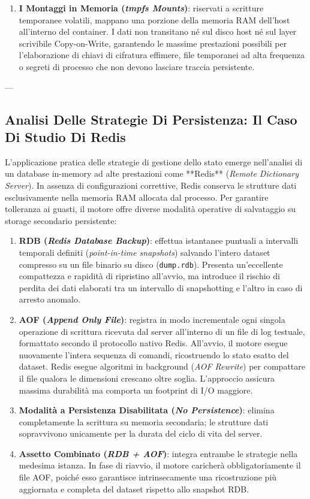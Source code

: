 \documentclass[11pt, a4paper]{article}
\begin{document}
\begin{enumerate}
\begin{itemize}
    \end{itemize}
    \item \textbf{I Montaggi in Memoria (\emph{tmpfs Mounts})}: riservati a scritture temporanee volatili, mappano una porzione della memoria RAM dell'host all'interno del container. I dati non transitano né sul disco host né sul layer scrivibile Copy-on-Write, garantendo le massime prestazioni possibili per l'elaborazione di chiavi di cifratura effimere, file temporanei ad alta frequenza o segreti di processo che non devono lasciare traccia persistente.
\end{enumerate}

---

\subsection{Analisi Delle Strategie Di Persistenza: Il Caso Di Studio Di Redis}

L'applicazione pratica delle strategie di gestione dello stato emerge nell'analisi di un database in-memory ad alte prestazioni come **Redis** (\emph{Remote Dictionary Server}). In assenza di configurazioni correttive, Redis conserva le strutture dati esclusivamente nella memoria RAM allocata dal processo. Per garantire tolleranza ai guasti, il motore offre diverse modalità operative di salvataggio su storage secondario persistente:

\begin{enumerate}
    \item \textbf{RDB (\emph{Redis Database Backup})}: effettua istantanee puntuali a intervalli temporali definiti (\emph{point-in-time snapshots}) salvando l'intero dataset compresso su un file binario su disco (\texttt{dump.rdb}). Presenta un'eccellente compattezza e rapidità di ripristino all'avvio, ma introduce il rischio di perdita dei dati elaborati tra un intervallo di snapshotting e l'altro in caso di arresto anomalo.
    \item \textbf{AOF (\emph{Append Only File})}: registra in modo incrementale ogni singola operazione di scrittura ricevuta dal server all'interno di un file di log testuale, formattato secondo il protocollo nativo Redis. All'avvio, il motore esegue nuovamente l'intera sequenza di comandi, ricostruendo lo stato esatto del dataset. Redis esegue algoritmi in background (\emph{AOF Rewrite}) per compattare il file qualora le dimensioni crescano oltre soglia. L'approccio assicura massima durabilità ma comporta un footprint di I/O maggiore.
    \item \textbf{Modalità a Persistenza Disabilitata (\emph{No Persistence})}: elimina completamente la scrittura su memoria secondaria; le strutture dati sopravvivono unicamente per la durata del ciclo di vita del server.
    \item \textbf{Assetto Combinato (\emph{RDB + AOF})}: integra entrambe le strategie nella medesima istanza. In fase di riavvio, il motore caricherà obbligatoriamente il file AOF, poiché esso garantisce intrinsecamente una ricostruzione più aggiornata e completa del dataset rispetto allo snapshot RDB.
\end{enumerate}
\end{document}
